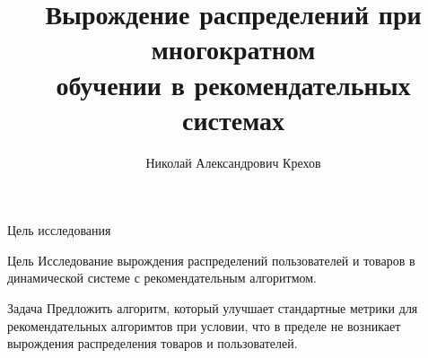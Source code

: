 \documentclass{beamer}
\title[\hbox to 56mm{Многократное обучение}]{Вырождение распределений при  многократном  \\ обучении в рекомендательных системах}
\author[Н.\,А.~Крехов]{Николай Александрович Крехов}
\institute{Московский физико-технический институт}
\date{\footnotesize
\par\smallskip\emph{Курс:} Моя первая научная статья
\par\smallskip\emph{Эксперт:} к.ф.-м.н. А.\,С.~Хританков
\par\smallskip\emph{Консультант:} А.\,С.~Веприков
\par\bigskip\small 2024}
\begin{document}

\begin{frame}

    \thispagestyle{empty}
    \maketitle
    
\end{frame}


\begin{frame}{Цель исследования}
    \begin{block}{Цель}
        Исследование вырождения распределений пользователей и товаров в динамической системе с рекомендательным алгоритмом.
    \end{block}
    \begin{block}{Задача}
        Предложить алгоритм, который улучшает стандартные метрики для рекомендательных алгоримтов при условии, что в пределе не возникает вырождения распределения товаров и пользователей.
    \end{block}

\end{frame}

\end{document}
